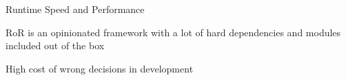 Runtime Speed and Performance

RoR is an opinionated framework with a lot of hard dependencies and modules included out of the box

High cost of wrong decisions in development